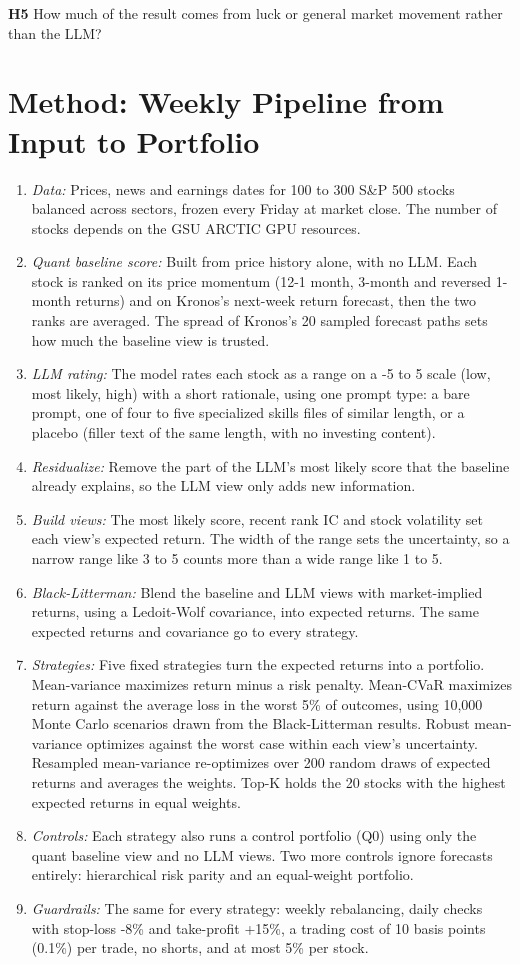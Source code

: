 \documentclass[conference]{IEEEtran}
\begin{document}
\noindent\textbf{H5} How much of the result comes from luck or general market movement rather than the LLM?

\section{Method: Weekly Pipeline from Input to Portfolio}
\begin{enumerate}
\item \textit{Data:} Prices, news and earnings dates for 100 to 300 S\&P 500 stocks balanced across sectors, frozen every Friday at market close. The number of stocks depends on the GSU ARCTIC GPU resources.
\item \textit{Quant baseline score:} Built from price history alone, with no LLM. Each stock is ranked on its price momentum (12-1 month, 3-month and reversed 1-month returns) and on Kronos's next-week return forecast, then the two ranks are averaged. The spread of Kronos's 20 sampled forecast paths sets how much the baseline view is trusted.
\item \textit{LLM rating:} The model rates each stock as a range on a -5 to 5 scale (low, most likely, high) with a short rationale, using one prompt type: a bare prompt, one of four to five specialized skills files of similar length, or a placebo (filler text of the same length, with no investing content).
\item \textit{Residualize:} Remove the part of the LLM's most likely score that the baseline already explains, so the LLM view only adds new information.
\item \textit{Build views:} The most likely score, recent rank IC and stock volatility set each view's expected return. The width of the range sets the uncertainty, so a narrow range like 3 to 5 counts more than a wide range like 1 to 5.
\item \textit{Black-Litterman:} Blend the baseline and LLM views with market-implied returns, using a Ledoit-Wolf covariance, into expected returns. The same expected returns and covariance go to every strategy.
\item \textit{Strategies:} Five fixed strategies turn the expected returns into a portfolio. Mean-variance maximizes return minus a risk penalty. Mean-CVaR maximizes return against the average loss in the worst 5\% of outcomes, using 10,000 Monte Carlo scenarios drawn from the Black-Litterman results. Robust mean-variance optimizes against the worst case within each view's uncertainty. Resampled mean-variance re-optimizes over 200 random draws of expected returns and averages the weights. Top-K holds the 20 stocks with the highest expected returns in equal weights.
\item \textit{Controls:} Each strategy also runs a control portfolio (Q0) using only the quant baseline view and no LLM views. Two more controls ignore forecasts entirely: hierarchical risk parity and an equal-weight portfolio.
\item \textit{Guardrails:} The same for every strategy: weekly rebalancing, daily checks with stop-loss -8\% and take-profit +15\%, a trading cost of 10 basis points (0.1\%) per trade, no shorts, and at most 5\% per stock.
\end{enumerate}
\end{document}
